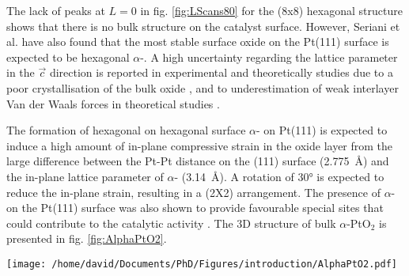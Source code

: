 The lack of peaks at $L=0$ in fig. \ref{fig:LScans80} for the (8x8) hexagonal structure shows that there is no bulk structure on the catalyst surface.
However, Seriani et al. \parencite*{Seriani2006} have also found that the most stable surface oxide on the Pt(111) surface is expected to be hexagonal $\alpha$-.
A high uncertainty regarding the lattice parameter in the $\vec{c}$ direction is reported in experimental and theoretically studies due to a poor crystallisation of the bulk oxide \parencite{Muller1968}, and to underestimation of weak interlayer Van der Waals forces in theoretical studies \parencite{Li2005}.

The formation of hexagonal on hexagonal surface $\alpha$- on Pt(111) is expected to induce a high amount of in-plane compressive strain in the oxide layer from the large difference between the Pt-Pt distance on the (111) surface (\qty{2.775}{\angstrom}) and the in-plane lattice parameter of $\alpha$- (\qty{3.14}{\angstrom}).
A rotation of \ang{30} is expected to reduce the in-plane strain, resulting in a (2X2) arrangement.
The presence of $\alpha$- on the Pt(111) surface was also shown to provide favourable special sites that could contribute to the catalytic activity \parencite{Li2005}.
The 3D structure of bulk $\alpha$-PtO$_2$ is presented in fig. \ref{fig:AlphaPtO2}.

\begin{SCfigure}
    \centering
    \texttt{[image: /home/david/Documents/PhD/Figures/introduction/AlphaPtO2.pdf]}
    \caption{
        $\alpha$- bulk unit cell.
        Platinum atoms are situated on the unit cell corners while the two oxygen atoms are at the positions $(1/3, 2/3, 1/4)$ and $(2/3, 1/3, 3/4)$.
    }
    \label{fig:AlphaPtO2}
\end{SCfigure}

